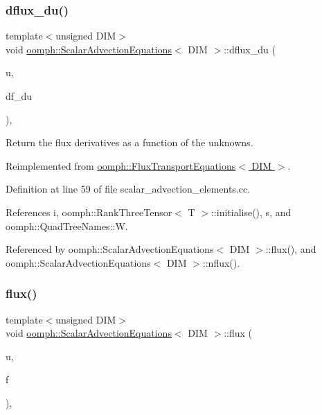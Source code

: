 \subsubsection{\texorpdfstring{dflux\+\_\+du()}{dflux\_du()}}
{\footnotesize\ttfamily template$<$unsigned D\+IM$>$ \\
void \hyperlink{classoomph_1_1ScalarAdvectionEquations}{oomph\+::\+Scalar\+Advection\+Equations}$<$ D\+IM $>$\+::dflux\+\_\+du (\begin{DoxyParamCaption}\item[{const \hyperlink{classoomph_1_1Vector}{Vector}$<$ double $>$ \&}]{u,  }\item[{\hyperlink{classoomph_1_1RankThreeTensor}{Rank\+Three\+Tensor}$<$ double $>$ \&}]{df\+\_\+du }\end{DoxyParamCaption})\hspace{0.3cm}{\ttfamily [protected]}, {\ttfamily [virtual]}}



Return the flux derivatives as a function of the unknowns. 



Reimplemented from \hyperlink{classoomph_1_1FluxTransportEquations_a85c3239c26cb1fb4ddd102759eb0fc0d}{oomph\+::\+Flux\+Transport\+Equations$<$ D\+I\+M $>$}.



Definition at line 59 of file scalar\+\_\+advection\+\_\+elements.\+cc.



References i, oomph\+::\+Rank\+Three\+Tensor$<$ T $>$\+::initialise(), s, and oomph\+::\+Quad\+Tree\+Names\+::W.



Referenced by oomph\+::\+Scalar\+Advection\+Equations$<$ D\+I\+M $>$\+::flux(), and oomph\+::\+Scalar\+Advection\+Equations$<$ D\+I\+M $>$\+::nflux().

\mbox{\label{classoomph_1_1ScalarAdvectionEquations_af5a06cfaa7bff5d831b739545a57580f}} 
\subsubsection{\texorpdfstring{flux()}{flux()}}
{\footnotesize\ttfamily template$<$unsigned D\+IM$>$ \\
void \hyperlink{classoomph_1_1ScalarAdvectionEquations}{oomph\+::\+Scalar\+Advection\+Equations}$<$ D\+IM $>$\+::flux (\begin{DoxyParamCaption}\item[{const \hyperlink{classoomph_1_1Vector}{Vector}$<$ double $>$ \&}]{u,  }\item[{\hyperlink{classoomph_1_1DenseMatrix}{Dense\+Matrix}$<$ double $>$ \&}]{f }\end{DoxyParamCaption})\hspace{0.3cm}{\ttfamily [protected]}, {\ttfamily [virtual]}}



